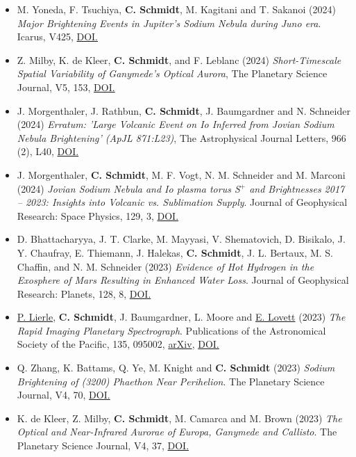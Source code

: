 \documentclass[12pt]{report}
\begin{document}
\begin{itemize}
  \item M. Yoneda, F. Tsuchiya, \textbf{C. Schmidt}, M. Kagitani and T. Sakanoi (2024) \textit{Major Brightening Events in Jupiter's Sodium Nebula during Juno era}. Icarus, V425, \href{https://doi.org/10.1016/j.icarus.2024.116301}{DOI.} 
  \item Z. Milby, K. de Kleer, \textbf{C. Schmidt}, and F. Leblanc (2024) \textit{Short-Timescale Spatial Variability of Ganymede’s Optical Aurora}, The Planetary Science Journal, V5, 153, \href{https://doi.org/10.3847/PSJ/ad49a2}{DOI.} 
  \item J. Morgenthaler, J. Rathbun, \textbf{C. Schmidt}, J. Baumgardner and N. Schneider (2024) \textit{Erratum: 'Large Volcanic Event on Io Inferred from Jovian Sodium Nebula Brightening' (ApJL 871:L23)}, The Astrophysical Journal Letters, 966 (2), L40, \href{https://doi.org/10.3847/2041-8213/ad4497}{DOI.}
  \item J. Morgenthaler, \textbf{C. Schmidt}, M. F. Vogt, N. M. Schneider and M. Marconi (2024) \textit{Jovian Sodium Nebula and Io plasma torus S$^+$ and Brightnesses 2017 – 2023: Insights into Volcanic vs. Sublimation Supply}. Journal of Geophysical Research: Space Physics, 129, 3, \href{https://doi.org/10.1029/2023JA032081}{DOI.}
  \item D. Bhattacharyya, J. T. Clarke, M. Mayyasi, V. Shematovich, D. Bisikalo, J. Y. Chaufray, E. Thiemann, J. Halekas, \textbf{C. Schmidt}, J. L. Bertaux, M. S. Chaffin, and N. M. Schneider (2023) \textit{Evidence of Hot Hydrogen in the Exosphere of Mars Resulting in Enhanced Water Loss}. Journal of Geophysical Research: Planets, 128, 8, \href{https://doi.org/10.1029/2023JE007801}{DOI.} 
  \item \underline{P. Lierle}, \textbf{C. Schmidt}, J. Baumgardner, L. Moore and \underline{E. Lovett} (2023) \textit{The Rapid Imaging Planetary Spectrograph}. Publications of the Astronomical Society of the Pacific, 135, 095002, \href{https://arxiv.org/abs/2307.16872}{arXiv}, \href{https://doi.org/10.1088/1538-3873/acec9f}{DOI.}
  \item Q. Zhang, K. Battams, Q. Ye, M. Knight and \textbf{C. Schmidt} (2023) \textit{Sodium Brightening of (3200) Phaethon Near Perihelion}. The Planetary Science Journal, V4, 70, \href{https://doi.org/10.3847/PSJ/acc866}{DOI.} 
  \item K. de Kleer, Z. Milby, \textbf{C. Schmidt}, M. Camarca and M. Brown (2023) \textit{The Optical and Near-Infrared Aurorae of Europa, Ganymede and Callisto}. The Planetary Science Journal, V4, 37, \href{https://doi.org/10.3847/PSJ/acb53c}{DOI.} 

\end{itemize}
\end{document}
